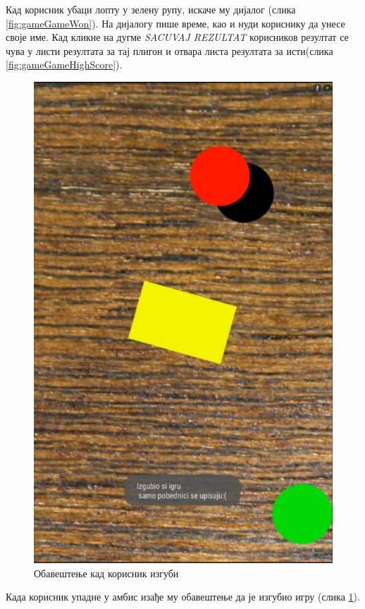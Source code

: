 Кад корисник убаци лопту у зелену рупу, искаче му дијалог (слика \ref{fig:gameGameWon}). На дијалогу пише време, као и нуди кориснику да унесе своје име. Кад кликне на дугме \emph{SACUVAJ REZULTAT} корисников резултат се чува у листи резултата за тај плигон и отвара листа резултата за исти(слика \ref{fig:gameGameHighScore}).
\begin{figure}[htb!]
\begin{center}
\includegraphics[scale=.4]{pictures/game/gameLose}
\caption{Обавештење кад корисник изгуби}\label{fig:gameLose}
\end{center}
\end{figure}
Када корисник упадне у амбис изађе му обавештење да је изгубио игру (слика \ref{fig:gameLose}). 

